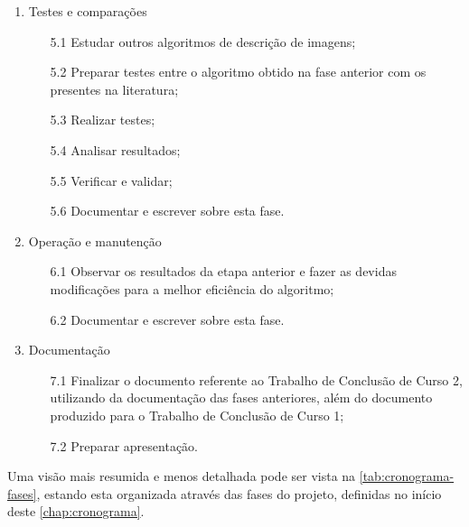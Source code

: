 \begin{enumerate}
    \item Testes e comparações
        \begin{enumerate}
            \item[5.1] Estudar outros algoritmos de descrição de imagens;
            \item[5.2] Preparar testes entre o algoritmo obtido na fase anterior com os presentes na literatura;
            \item[5.3] Realizar testes;
            \item[5.4] Analisar resultados;
            \item[5.5] Verificar e validar;
            \item[5.6] Documentar e escrever sobre esta fase.
        \end{enumerate}
    
    \item Operação e manutenção
        \begin{enumerate}
            \item[6.1] Observar os resultados da etapa anterior e fazer as devidas modificações para a melhor eficiência do algoritmo;
            \item[6.2] Documentar e escrever sobre esta fase.
        \end{enumerate}
        
    \item Documentação
        \begin{enumerate}
            \item[7.1] Finalizar o documento referente ao Trabalho de Conclusão de Curso 2, utilizando da documentação das fases anteriores, além do documento produzido para o Trabalho de Conclusão de Curso 1;
            \item[7.2] Preparar apresentação.
        \end{enumerate}
        
\end{enumerate}



Uma visão mais resumida e menos detalhada pode ser vista na \autoref{tab:cronograma-fases}, estando esta organizada através das fases do projeto, definidas no início deste \autoref{chap:cronograma}.

